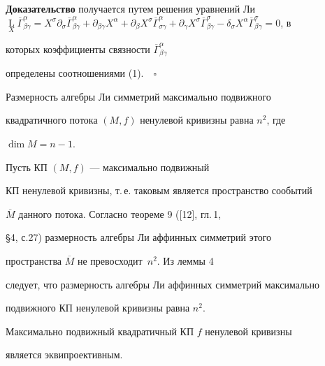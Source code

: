 {\bf Доказательство} получается путем решения уравнений Ли $\mathop{


L}\limits_{X}\overline{\Gamma}^{\alpha}_{\beta


\gamma}=X^{\sigma}\partial_{\sigma}\overline{\Gamma}^{\alpha}_{\beta


\gamma}+\partial_{\beta\gamma}X^{\alpha}


+\partial_{\beta}X^{\sigma}\overline{\Gamma}^{\alpha}_{\sigma \gamma}


+\partial_{\gamma}X^{\sigma}\overline{\Gamma}^{\sigma}_{\beta \gamma}


-\delta_{\sigma}X^{\alpha}\overline{\Gamma}^{\sigma}_{\beta


\gamma}= 0$, в


которых коэффициенты связности $\overline{\Gamma}^{\alpha}_{\beta \gamma}$


определены соотношениями (1).$\quad\square$





\begin{thm}


Размерность алгебры Ли симметрий максимально подвижного


квадратичного потока $(M,f) $ ненулевой кривизны равна $n^2$, где


$\dim M=n-1$.


\end{thm}





\begin{pf}


Пусть КП $(M,f) $ --- максимально подвижный


КП ненулевой кривизны, т.\,е. таковым является пространство сообытий


$\overline{M} $ данного потока. Согласно теореме 9 ([12], гл.\,1,


\S 4, с.27) размерность алгебры Ли аффинных симметрий этого


пространства $\overline{M} $ не превосходит~$n^2$. Из леммы 4


следует, что размерность алгебры Ли аффинных симметрий максимально


подвижного КП ненулевой кривизны равна $n^2$.


\end{pf}





\begin{lem}


Максимально подвижный квадратичный КП $f$ ненулевой кривизны


является эквипроективным.


\end{lem}





